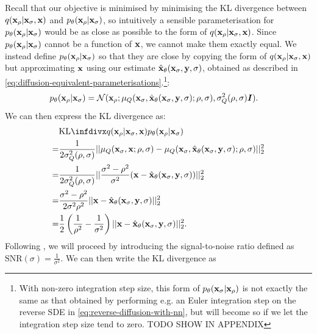 Recall that our objective is minimised by minimising the KL divergence between $q({\mathbf{x}}_\rho|{\mathbf{x}}_\sigma,{\mathbf{x}})$ and $p_\theta({\mathbf{x}}_{\rho}|{\mathbf{x}}_{\sigma})$, so intuitively a sensible parameterisation for $p_\theta({\mathbf{x}}_\rho|{\mathbf{x}}_\sigma)$ would be as close as possible to the form of $q({\mathbf{x}}_\rho|{\mathbf{x}}_\sigma,{\mathbf{x}})$. Since $p_\theta({\mathbf{x}}_{\rho}|{\mathbf{x}}_{\sigma})$ cannot be a function of ${\mathbf{x}}$, we cannot make them exactly equal. We instead define $p_\theta({\mathbf{x}}_\rho|{\mathbf{x}}_\sigma)$ so that they are close by copying the form of $q({\mathbf{x}}_\rho|{\mathbf{x}}_\sigma,{\mathbf{x}})$ but approximating ${\mathbf{x}}$ using our estimate $\hat{{\mathbf{x}}}_\theta({\mathbf{x}}_\sigma, {\mathbf{y}}, \sigma)$, obtained as described in \cref{eq:diffusion-equivalent-parameterisations}.\footnote{With non-zero integration step size, this form of $p_\theta({\mathbf{x}}_{\sigma} | {\mathbf{x}}_{\rho})$ is not exactly the same as that obtained by performing e.g. an Euler integration step on the reverse SDE in \cref{eq:reverse-diffusion-with-nn}, but will become so if we let the integration step size tend to zero. TODO SHOW IN APPENDIX}:
\begin{align}
    p_\theta({\mathbf{x}}_{\rho} | {\mathbf{x}}_{\sigma}) &= {\mathcal{N}}( {\mathbf{x}}_{\rho}; \mathbf{\mu}_Q({\mathbf{x}}_\sigma, \hat{{\mathbf{x}}}_\theta({\mathbf{x}}_\sigma, {\mathbf{y}}, \sigma); \rho, \sigma), \sigma_Q^2(\rho, \sigma) {\bm{I}} ).
\end{align}
We can then express the KL divergence as:
\begin{align}
    &\kl{q(\rvx_{\rho} | \rvx_{\sigma}, \rvx)}{p_\theta(\rvx_{\rho} | \rvx_{\sigma})} \\ 
    = &\frac{1}{2 \sigma_Q^2(\rho, \sigma)} || \mathbf{\mu}_Q(\rvx_\sigma, \rvx; \rho, \sigma) - \mathbf{\mu}_Q(\rvx_\sigma, \hat{\rvx}_\theta(\rvx_\sigma, \rvy, \sigma); \rho, \sigma) ||_2^2 \\
    = &\frac{1}{2 \sigma_Q^2(\rho, \sigma)} || \frac{\sigma^2-\rho^2}{\sigma^2} ( \rvx - \hat{\rvx}_\theta(\rvx_\sigma, \rvy, \sigma) ) ||_2^2 \\
    = &\frac{\sigma^2-\rho^2}{2 \sigma^2 \rho^2} || \rvx - \hat{\rvx}_\theta(\rvx_\sigma, \rvy, \sigma) ||_2^2 \\
    = &\frac{1}{2} \left( \frac{1}{\rho^2} - \frac{1}{\sigma^2} \right) || \rvx - \hat{\rvx}_\theta(\rvx_\sigma, \rvy, \sigma) ||_2^2.
\end{align}
Following \citet{kingma2021variational}, we will proceed by introducing the signal-to-noise ratio defined as $\text{SNR}(\sigma) = \frac{1}{\sigma^2}$. We can then write the KL divergence as

